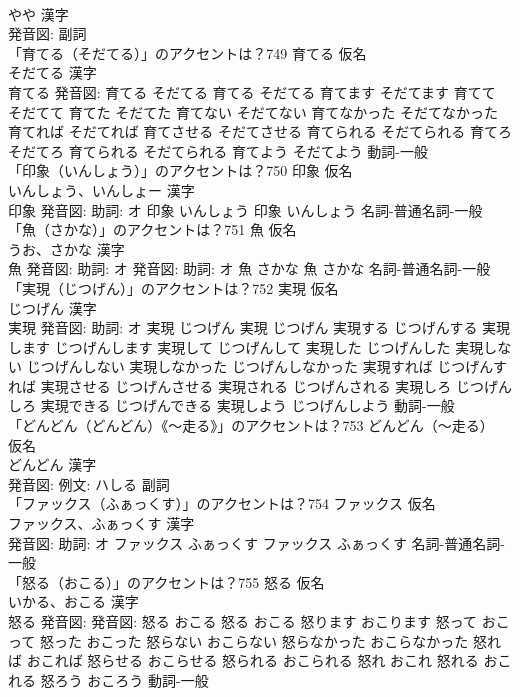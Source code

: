 \documentclass[8pt]{extreport}
\begin{document}
\begin{CJK}{UTF8}{min}
\\	やや 漢字　
\\	発音図:							副詞 
\\	「育てる（そだてる）」のアクセントは？749	育てる 仮名　
\\	そだてる 漢字　
\\	育てる 発音図:	育てる そだてる		育てる そだてる 育てます そだてます 育てて そだてて 育てた そだてた 育てない そだてない 育てなかった そだてなかった 育てれば そだてれば 育てさせる そだてさせる 育てられる そだてられる 育てろ そだてろ 育てられる そだてられる 育てよう そだてよう				動詞-一般 
\\	「印象（いんしょう）」のアクセントは？750	印象 仮名　
\\	いんしょう、いんしょー 漢字　
\\	印象 発音図: 助詞: オ	印象 いんしょう		印象 いんしょう				名詞-普通名詞-一般 
\\	「魚（さかな）」のアクセントは？751	魚 仮名　
\\	うお、さかな 漢字　
\\	魚 発音図: 助詞: オ 発音図: 助詞: オ	魚 さかな		魚 さかな				名詞-普通名詞-一般 
\\	「実現（じつげん）」のアクセントは？752	実現 仮名　
\\	じつげん 漢字　
\\	実現 発音図: 助詞: オ	実現 じつげん		実現 じつげん 実現する じつげんする 実現します じつげんします 実現して じつげんして 実現した じつげんした 実現しない じつげんしない 実現しなかった じつげんしなかった 実現すれば じつげんすれば 実現させる じつげんさせる 実現される じつげんされる 実現しろ じつげんしろ 実現できる じつげんできる 実現しよう じつげんしよう				動詞-一般 
\\	「どんどん（どんどん）《〜走る》」のアクセントは？753	どんどん（〜走る） 仮名　
\\	どんどん 漢字　
\\	発音図: 例文: ハしる							副詞 
\\	「ファックス（ふぁっくす）」のアクセントは？754	ファックス 仮名　
\\	ファックス、ふぁっくす 漢字　
\\	発音図: 助詞: オ	ファックス ふぁっくす		ファックス ふぁっくす				名詞-普通名詞-一般 
\\	「怒る（おこる）」のアクセントは？755	怒る 仮名　
\\	いかる、おこる 漢字　
\\	怒る 発音図: 発音図:	怒る おこる		怒る おこる 怒ります おこります 怒って おこって 怒った おこった 怒らない おこらない 怒らなかった おこらなかった 怒れば おこれば 怒らせる おこらせる 怒られる おこられる 怒れ おこれ 怒れる おこれる 怒ろう おころう				動詞-一般 

\end{CJK}
\end{document}
